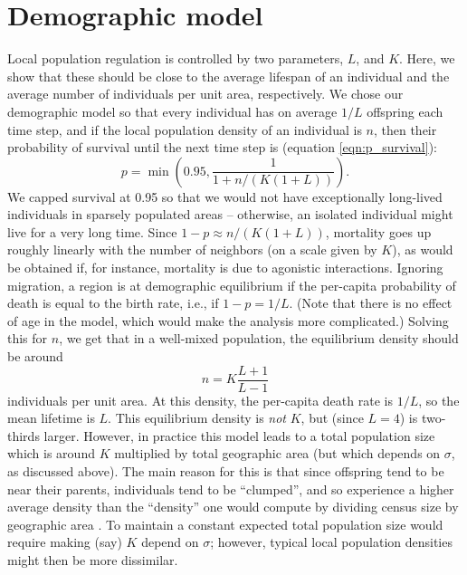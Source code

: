 \documentclass[10pt,twoside,lineno,hidelinks]{preprint}
\begin{document}
\section{Demographic model}
Local population regulation is controlled by two parameters, $L$, and $K$.
Here, we show that these should be close to the average lifespan of an individual
and the average number of individuals per unit area, respectively.
We chose our demographic model so that every individual has on average $1/L$ offspring
each time step,
and if the local population density of an individual is $n$,
then their probability of survival until the next time step is
(equation \eqref{eqn:p_survival}):
\begin{equation}
    p = \min\left( 0.95, \frac{1}{1 + n / (K (1+L))} \right) .
\end{equation}
We capped survival at 0.95 so that we would not have exceptionally long-lived individuals
in sparsely populated areas --
otherwise, an isolated individual might live for a very long time.
Since $1 - p \approx n / (K (1 + L))$,
mortality goes up roughly linearly with the number of neighbors (on a scale given by $K$),
as would be obtained if, for instance, mortality is due to agonistic interactions.
Ignoring migration,
a region is at demographic equilibrium if the per-capita probability of death
is equal to the birth rate,
i.e., if $1 - p = 1/L$.
(Note that there is no effect of age in the model,
which would make the analysis more complicated.)
Solving this for $n$,
we get that in a well-mixed population, the equilibrium density should be around
\begin{equation}
    n = K \frac{L+1}{L-1}
\end{equation}
individuals per unit area.
At this density, the per-capita death rate is $1/L$, so the mean lifetime is $L$.
This equilibrium density is \emph{not} $K$, but (since $L=4$) is two-thirds larger.
However, in practice this model leads to a total population size which is around $K$
multiplied by total geographic area
(but which depends on $\sigma$, as discussed above).
The main reason for this is that
since offspring tend to be near their parents, individuals tend to be ``clumped'',
and so experience a higher average density than the ``density'' one would compute
by dividing census size by geographic area \citep{lloyd1967crowding}.
To maintain a constant expected total population size
would require making (say) $K$ depend on $\sigma$;
however, typical local population densities might then be more dissimilar.
\end{document}
